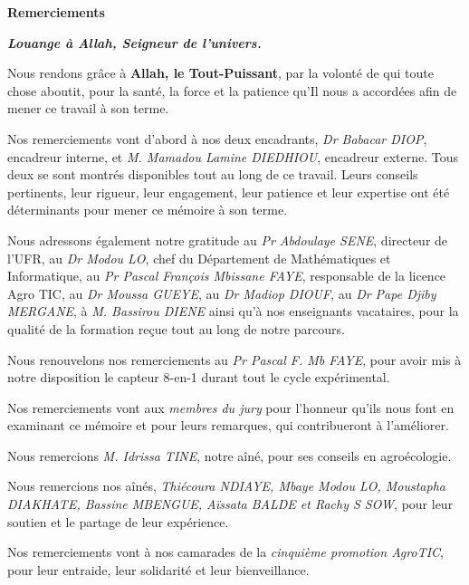 \thispagestyle{empty}

\begin{center}
    {\fontsize{28}{34}\selectfont\bfseries Remerciements\par}
\end{center}

\vspace{0.3cm}

{\fontsize{12}{15}\selectfont
{}
\setlength{\parindent}{0pt}
\setlength{\parskip}{0.2cm}

\textbf{\textit{Louange à Allah, Seigneur de l'univers.}}

Nous rendons grâce à \textbf{Allah, le Tout-Puissant}, par la volonté de qui toute chose aboutit, pour la santé, la force et la patience qu'Il nous a accordées afin de mener ce travail à son terme.

Nos remerciements vont d'abord à nos deux encadrants, \textit{Dr Babacar DIOP}, encadreur interne, et \textit{M. Mamadou Lamine DIEDHIOU}, encadreur externe. Tous deux se sont montrés disponibles tout au long de ce travail. Leurs conseils pertinents, leur rigueur, leur engagement, leur patience et leur expertise ont été déterminants pour mener ce mémoire à son terme.

Nous adressons également notre gratitude au \textit{Pr Abdoulaye SENE}, directeur de l'UFR, au \textit{Dr Modou LO}, chef du Département de Mathématiques et Informatique, au \textit{Pr Pascal François Mbissane FAYE}, responsable de la licence Agro TIC, au \textit{Dr Moussa GUEYE}, au \textit{Dr Madiop DIOUF}, au \textit{Dr Pape Djiby MERGANE}, à \textit{M. Bassirou DIENE} ainsi qu'à nos enseignants vacataires, pour la qualité de la formation reçue tout au long de notre parcours.

Nous renouvelons nos remerciements au \textit{Pr Pascal F. Mb FAYE}, pour avoir mis à notre disposition le capteur 8-en-1 durant tout le cycle expérimental.

Nos remerciements vont aux \textit{membres du jury} pour l'honneur qu'ils nous font en examinant ce mémoire et pour leurs remarques, qui contribueront à l'améliorer.

Nous remercions \textit{M. Idrissa TINE}, notre aîné, pour ses conseils en agroécologie.

Nous remercions nos aînés, \textit{Thiécoura NDIAYE, Mbaye Modou LO, Moustapha DIAKHATE, Bassine MBENGUE, Aïssata BALDE et Rachy S SOW}, pour leur soutien et le partage de leur expérience. 

Nos remerciements vont à nos camarades de la \textit{cinquième promotion AgroTIC}, pour leur entraide, leur solidarité et leur bienveillance.

}

